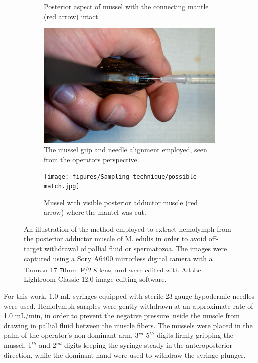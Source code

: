 \begin{figure}[H]
\begin{subfigure}[b]{.45\textwidth}
        \caption{Posterior aspect of mussel with the connecting mantle (red arrow) intact.}
        \label{sfig:b}
    \end{subfigure}
    \newline
    \begin{subfigure}[b]{.45\textwidth}
        \centering
        \includegraphics[width=\textwidth]{figures/Sampling technique/hands colors centered.jpg}
        \caption{The mussel grip and needle alignment employed, seen from the operators perspective.}
        \label{sfig:c}
    \end{subfigure}
    \hfill
    \begin{subfigure}[b]{.45\textwidth}
        \centering
        \texttt{[image: figures/Sampling technique/possible match.jpg]}
        \caption{Mussel with visible posterior adductor muscle (red arrow) where the mantel was cut.}
        \label{sfig:d}
    \end{subfigure}
    \caption{An illustration of the method employed to extract hemolymph from the posterior adductor muscle of M. edulis in order to avoid off-target withdrawal of pallial fluid or spermatozoa. The images were captured using a Sony A6400 mirrorless digital camera with a Tamron 17-70mm F/2.8 lens, and were edited with Adobe\textsuperscript{\textregistered} Lightroom Classic 12.0 image editing software.}
    \label{fig:Hemolymph_sampling_illustration}
\end{figure}

For this work, 1.0 mL syringes equipped with sterile 23 gauge hypodermic needles were used. Hemolymph samples were gently withdrawn at an approximate rate of 1.0 mL/min, in order to prevent the negative pressure inside the muscle from drawing in pallial fluid between the muscle fibers. The mussels were placed in the palm of the operator's non-dominant arm, 3$^{rd}$-5$^{th}$ digits firmly gripping the mussel, 1$^{th}$ and 2$^{nd}$ digits keeping the syringe steady in the anteroposterior direction, while the dominant hand were used to withdraw the syringe plunger.

